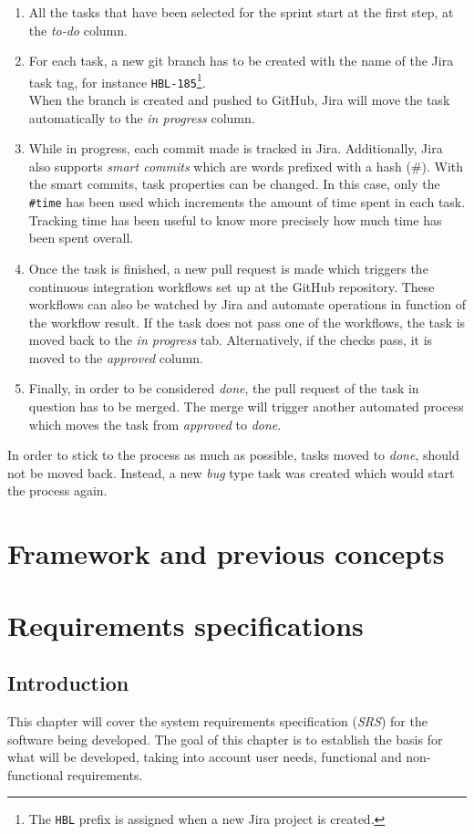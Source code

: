 \documentclass[a4paper, 12pt, oneside]{book}
\begin{document}
\begin{enumerate}
	\item All the tasks that have been selected for the sprint start at the first step, at the \emph{to-do} column.
	\item For each task, a new git branch has to be created with the name of the Jira task tag, for instance \texttt{HBL-185}\footnote{The \texttt{HBL} prefix is assigned when a new Jira project is created.}.
	      \\
	      When the branch is created and pushed to GitHub, Jira will move the task automatically to the \emph{in progress} column.
	\item While in progress, each commit made is tracked in Jira. Additionally, Jira also supports \emph{smart commits} which are words prefixed with a hash (\#). With the smart commits, task properties can be changed. In this case, only the \texttt{\#time} has been used which increments the amount of time spent in each task. Tracking time has been useful to know more precisely how much time has been spent overall.
	\item Once the task is finished, a new pull request is made which triggers the continuous integration workflows set up at the GitHub repository. These workflows can also be watched by Jira and automate operations in function of the workflow result. If the task does not pass one of the workflows, the task is moved back to the \emph{in progress} tab. Alternatively, if the checks pass, it is moved to the \emph{approved} column.
	\item Finally, in order to be considered \emph{done}, the pull request of the task in question has to be merged. The merge will trigger another automated process which moves the task from \emph{approved} to \emph{done}.
\end{enumerate}
In order to stick to the process as much as possible, tasks moved to \emph{done}, should not be moved back. Instead, a new \emph{bug} type task was created which would start the process again.
\chapter{Framework and previous concepts}
\chapter{Requirements specifications}
\section{Introduction}
This chapter will cover the system requirements specification (\emph{SRS}) for the software being developed. The goal of this chapter is to establish the basis for what will be developed, taking into account user needs, functional and non-functional requirements.
\end{document}

